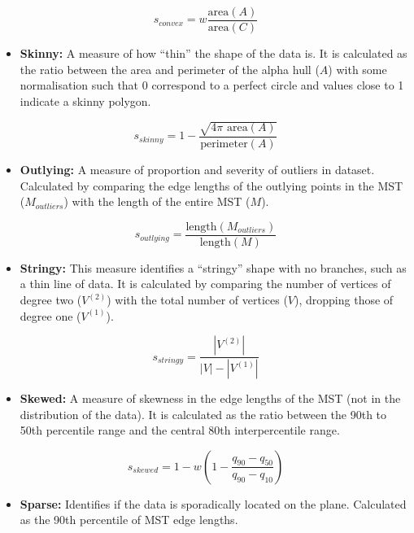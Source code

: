 \[s_{convex}=w\frac{\mbox{area}(A)}{\mbox{area}(C)}\]

\begin{itemize}
\tightlist
\item
  \textbf{Skinny:} A measure of how ``thin'' the shape of the data is.
  It is calculated as the ratio between the area and perimeter of the
  alpha hull (\(A\)) with some normalisation such that 0 correspond to a
  perfect circle and values close to 1 indicate a skinny polygon.
\end{itemize}

\[s_{skinny}= 1-\frac{\sqrt{4\pi \mbox{ area}(A)}}{\mbox{perimeter}(A)}\]

\begin{itemize}
\tightlist
\item
  \textbf{Outlying:} A measure of proportion and severity of outliers in
  dataset. Calculated by comparing the edge lengths of the outlying
  points in the MST (\(M_{outliers}\)) with the length of the entire MST
  (\(M\)).
\end{itemize}

\[s_{outlying}=\frac{\mbox{length}(M_{outliers})}{\mbox{length}(M)}\]

\begin{itemize}
\tightlist
\item
  \textbf{Stringy:} This measure identifies a ``stringy'' shape with no
  branches, such as a thin line of data. It is calculated by comparing
  the number of vertices of degree two (\(V^{(2)}\)) with the total
  number of vertices (\(V\)), dropping those of degree one
  (\(V^{(1)}\)).
\end{itemize}

\[s_{stringy} = \frac{|V^{(2)}|}{|V|-|V^{(1)}|}\]

\begin{itemize}
\tightlist
\item
  \textbf{Skewed:} A measure of skewness in the edge lengths of the MST
  (not in the distribution of the data). It is calculated as the ratio
  between the 90th to 50th percentile range and the central 80th
  interpercentile range.
\end{itemize}

\[s_{skewed} = 1-w\left(1-\frac{q_{90}-{q_{50}}}{q_{90}-q_{10}}\right)\]

\begin{itemize}
\tightlist
\item
  \textbf{Sparse:} Identifies if the data is sporadically located on the
  plane. Calculated as the 90th percentile of MST edge lengths.
\end{itemize}

